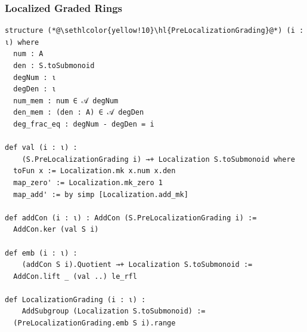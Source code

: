 \documentclass[9pt]{beamer}
\begin{document}
\begin{frame}
  \frametitle{Localized Graded Rings}
\begin{lstlisting}[linebackgroundcolor={%
  \ifnum\value{lstnumber}=10\color{red!10}\fi
  \ifnum\value{lstnumber}=11\color{red!10}\fi
  \ifnum\value{lstnumber}=12\color{red!10}\fi
  \ifnum\value{lstnumber}=13\color{red!10}\fi
  \ifnum\value{lstnumber}=14\color{red!10}\fi
  % \ifnum\value{lstnumber}=15\color{red!10}\fi
  \ifnum\value{lstnumber}=16\color{green!10}\fi
  \ifnum\value{lstnumber}=17\color{green!10}\fi
  % \ifnum\value{lstnumber}=19\color{green!10}\fi
  \ifnum\value{lstnumber}=19\color{purple!15}\fi
  \ifnum\value{lstnumber}=20\color{purple!15}\fi
  \ifnum\value{lstnumber}=21\color{purple!15}\fi
  % \ifnum\value{lstnumber}=24\color{purple!15}\fi
  \ifnum\value{lstnumber}=23\color{olive!10}\fi
  \ifnum\value{lstnumber}=24\color{olive!10}\fi
  \ifnum\value{lstnumber}=25\color{olive!10}\fi
}, caption={Grading of localized rings}]
structure (*@\sethlcolor{yellow!10}\hl{PreLocalizationGrading}@*) (i : ι) where
  num : A
  den : S.toSubmonoid
  degNum : ι
  degDen : ι
  num_mem : num ∈ 𝒜 degNum
  den_mem : (den : A) ∈ 𝒜 degDen
  deg_frac_eq : degNum - degDen = i

def val (i : ι) : 
    (S.PreLocalizationGrading i) →+ Localization S.toSubmonoid where
  toFun x := Localization.mk x.num x.den
  map_zero' := Localization.mk_zero 1
  map_add' := by simp [Localization.add_mk]

def addCon (i : ι) : AddCon (S.PreLocalizationGrading i) := 
  AddCon.ker (val S i)

def emb (i : ι) : 
    (addCon S i).Quotient →+ Localization S.toSubmonoid :=
  AddCon.lift _ (val ..) le_rfl

def LocalizationGrading (i : ι) : 
    AddSubgroup (Localization S.toSubmonoid) := 
  (PreLocalizationGrading.emb S i).range
\end{lstlisting} 
\end{frame}
\end{document}
